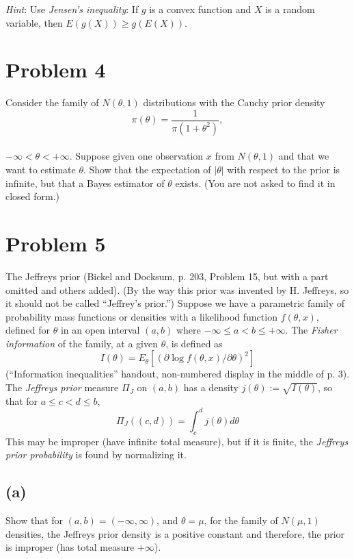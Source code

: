 \documentclass[11pt]{article}
\newcommand{\ProbS}{\iftrue}
\newcommand{\ProbE}{\fi}
\begin{document}
\emph{Hint}: Use \emph{Jensen's inequality}: If $g$ is a convex function and $X$ is a random variable, then $E(g(X)) \geq g(E(X))$.
\ProbE

\section{Problem 4}
\ProbS
Consider the family of $N(\theta, 1)$ distributions with the Cauchy prior density
$$
\pi(\theta) = \frac{1}{\pi(1+\theta^2)},
$$
\\
$-\infty < \theta < +\infty$.
Suppose given one observation $x$ from $N(\theta, 1)$
and that we want to estimate $\theta$.
Show that the expectation of $|\theta|$ with respect to the prior is infinite, but that a Bayes estimator of $\theta$ exists.
(You are not asked to find it in closed form.)
\ProbE

\section{Problem 5}
\ProbS
The Jeffreys prior (Bickel and Docksum, p. 203, Problem 15, but with a part omitted and others added). (By the way this prior was invented by H. Jeffreys, so it should not be called ``Jeffrey's prior.'')
Suppose we have a parametric family of probability mass functions or densities with a likelihood function $f(\theta, x)$, defined for $\theta$ in an open interval $(a,b)$ where $-\infty \leq a < b \leq +\infty$.
The \emph{Fisher information} of the family, at a given $\theta$, is defined as
$$
I(\theta) = E_{\theta}[(\partial \log f(\theta, x) / \partial \theta)^2]
$$
(``Information inequalities'' handout, non-numbered display in the middle of p. 3). The \emph{Jeffreys prior} measure $\Pi_{J}$ on $(a,b)$ has a density
$
j(\theta) := \sqrt{I(\theta)}
$, so that for
$a \leq c < d \leq b$,
$$
\Pi_{J}((c,d)) = \int_{c}^{d} j(\theta) d\theta
$$
This may be improper (have infinite total measure), but if it is finite, the \emph{Jeffreys prior probability} is found by normalizing it.
\ProbE

\subsection*{(a)}
\ProbS
Show that for $(a,b) = (-\infty, \infty)$, and $\theta = \mu$, for the family of $N(\mu, 1)$ densities, the Jeffreys prior density is a positive constant and therefore, the prior is improper (has total measure $+\infty$).
\ProbE
\end{document}
